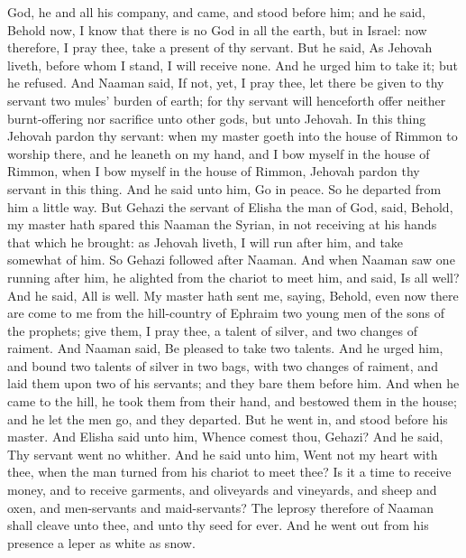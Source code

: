 God, he and all his company, and came, and stood before him; and he said, Behold now, I know that there is no God in all the earth, but in Israel: now therefore, I pray thee, take a present of thy servant. But he said, As Jehovah liveth, before whom I stand, I will receive none. And he urged him to take it; but he refused. And Naaman said, If not, yet, I pray thee, let there be given to thy servant two mules’ burden of earth; for thy servant will henceforth offer neither burnt-offering nor sacrifice unto other gods, but unto Jehovah. In this thing Jehovah pardon thy servant: when my master goeth into the house of Rimmon to worship there, and he leaneth on my hand, and I bow myself in the house of Rimmon, when I bow myself in the house of Rimmon, Jehovah pardon thy servant in this thing. And he said unto him, Go in peace. So he departed from him a little way.  But Gehazi the servant of Elisha the man of God, said, Behold, my master hath spared this Naaman the Syrian, in not receiving at his hands that which he brought: as Jehovah liveth, I will run after him, and take somewhat of him. So Gehazi followed after Naaman. And when Naaman saw one running after him, he alighted from the chariot to meet him, and said, Is all well? And he said, All is well. My master hath sent me, saying, Behold, even now there are come to me from the hill-country of Ephraim two young men of the sons of the prophets; give them, I pray thee, a talent of silver, and two changes of raiment. And Naaman said, Be pleased to take two talents. And he urged him, and bound two talents of silver in two bags, with two changes of raiment, and laid them upon two of his servants; and they bare them before him. And when he came to the hill, he took them from their hand, and bestowed them in the house; and he let the men go, and they departed. But he went in, and stood before his master. And Elisha said unto him, Whence comest thou, Gehazi? And he said, Thy servant went no whither. And he said unto him, Went not my heart with thee, when the man turned from his chariot to meet thee? Is it a time to receive money, and to receive garments, and oliveyards and vineyards, and sheep and oxen, and men-servants and maid-servants? The leprosy therefore of Naaman shall cleave unto thee, and unto thy seed for ever. And he went out from his presence a leper as white as snow. 


